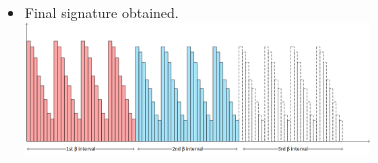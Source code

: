 \documentclass[xcolor=table]{beamer}
\begin{document}
\begin{frame}
\begin{itemize}
\item<5-> Final signature obtained.
 {\includegraphics[height=3.5cm]{QuantificationSphericToHist4.png}}

\end{itemize}


\end{frame}

\end{document}
